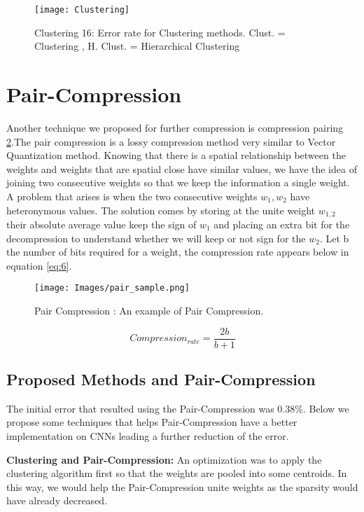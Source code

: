 \begin{figure}[h]
\centering
\texttt{[image: Clustering]} 
\decoRule
\caption[Clustering 16 ]{Clustering 16: Error rate for Clustering methods. 
Clust. = Clustering , H. Clust. = Hierarchical Clustering
}
\label{fig:17}
\end{figure}

\section{Pair-Compression}
Another technique we proposed for further compression is compression pairing \ref{fig:pair_sample}.The pair compression is a lossy compression method very similar to Vector Quantization method. Knowing that there is a spatial relationship between the weights and weights that are spatial close have similar values, we have the idea of joining two consecutive weights so that we keep the information a single weight. A problem that arises is when the two consecutive weights $w_{1},w_{2}$ have heteronymous values. The solution comes by storing at the unite weight $w_{1,2}$ their absolute average value keep the sign of $w_{1}$ and placing an extra bit for the decompression to understand whether we will keep or not sign for the $w_{2}$. Let b the number of bits required for a weight, the compression rate appears below in equation \ref{eq:6}.


\begin{figure}[h]
\centering
\texttt{[image: Images/pair\_sample.png]} 
\decoRule
\caption[Pair Compression example]{Pair Compression : An example of Pair Compression. 
}
\label{fig:pair_sample}
\end{figure}

\begin{equation}\label{eq:6}
   Compression_{rate} = \frac{2b}{b+1}  \end{equation}
\subsection{Proposed Methods and Pair-Compression}
The initial error that resulted using the Pair-Compression was 0.38\%. Below we propose some techniques that helps Pair-Compression have a better implementation on CNNs leading a further reduction of the error. \newline


\textbf{Clustering and Pair-Compression: }An optimization was to apply the clustering algorithm first so that the weights are pooled into some centroids. In this way, we would help the Pair-Compression unite weights as the sparsity would have already decreased.\newline

